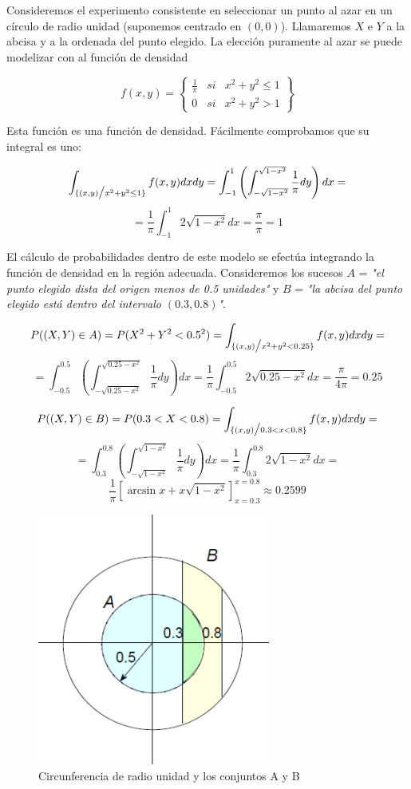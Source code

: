 \begin{theorem}
    Consideremos el experimento consistente en seleccionar un punto al azar en un círculo de radio unidad 
    (suponemos centrado en \((0, 0)\)). Llamaremos \(X\) e \(Y\) a la abcisa y a la ordenada del punto elegido. 
    La elección puramente al azar se puede modelizar con al función de densidad
    
    \[f(x, y) = \left\{
        \begin{array}{rcr}
            \frac{1}{\pi}   & si    & x^2 + y^2 \leq 1 \\
            0               & si    & x^2 + y^2 > 1
        \end{array}
    \right\}\]

    Esta función es una función de densidad. Fácilmente comprobamos que su integral es uno:

    \[\int_{\{(x, y) \big{/} x^2 + y^2 \leq 1\}} f(x, y)dxdy = \int_{-1}^{1} \left(\int_{-\sqrt{1 - x^2}}^{\sqrt{1 - x^2}} \frac{1}{\pi}dy\right)dx =\]
    \[=\frac{1}{\pi}\int_{-1}^{1} 2\sqrt{1 - x^2}dx = \frac{\pi}{\pi} = 1\]

    El cálculo de probabilidades dentro de este modelo se efectúa integrando la función de densidad en la región adecuada. 
    Consideremos los sucesos $A$ = \textit{"el punto elegido dista del origen menos de 0.5 unidades"} y $B$ = \textit{"la abcisa del 
    punto elegido está dentro del intervalo $(0.3, 0.8)$"}.
    
    \[P((X, Y) \in A) = P(X^2 + Y^2 < 0.5^2) = \int_{\{(x, y) \big{/} x^2 + y^2 < 0.25\}} f(x, y)dxdy =\]
    \[= \int_{-0.5}^{0.5} \left(\int_{-\sqrt{0.25 - x^2}}^{\sqrt{0.25 - x^2}} \frac{1}{\pi}dy\right)dx = \frac{1}{\pi}\int_{-0.5}^{0.5} 2\sqrt{0.25 - x^2}dx = \frac{\pi}{4\pi} = 0.25\]

    \[ P((X, Y) \in B) = P(0.3 < X < 0.8) = \int_{\{ (x, y) \big{/} 0.3 < x < 0.8 \}} f(x, y)dxdy = \]
    \[ = \int_{0.3}^{0.8} \left( \int_{-\sqrt{1 - x^2}}^{\sqrt{1 - x^2}} \frac{1}{\pi}dy \right) dx = \frac{1}{\pi} \int_{0.3}^{0.8} 2\sqrt{1 - x^2} dx = \]
    \[ \frac{1}{\pi} \left[ \arcsin x + x\sqrt{1 - x^2} \right]_{x = 0.3}^{x = 0.8} \approx 0.2599 \]

\end{theorem}

\begin{figure}[htbp]
    \center
    \includegraphics[scale=0.6]{img/Ejemplo2.png}
    \caption{Circunferencia de radio unidad y los conjuntos A y B}
\end{figure}
